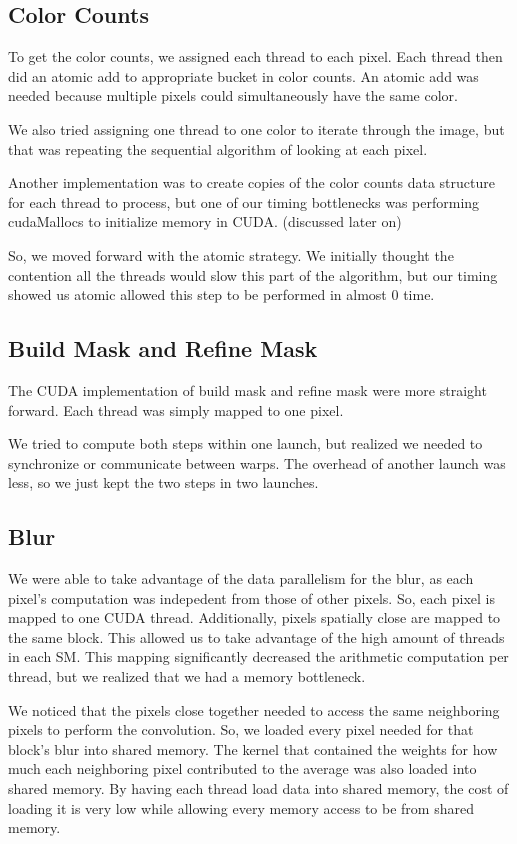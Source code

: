 \documentclass[12pt]{article}
\begin{document}
\subsection{Color Counts}

To get the color counts, we assigned each thread to each pixel. Each thread
then did an atomic add to appropriate bucket in color counts. An atomic add was
needed because multiple pixels could simultaneously have the same color.

We also tried assigning one thread to one color to iterate through the image,
but that was repeating the sequential algorithm of looking at each pixel.

Another implementation was to create copies of the color counts data structure
for each thread to process, but one of our timing bottlenecks was performing
cudaMallocs to initialize memory in CUDA. (discussed later on)

So, we moved forward with the atomic strategy. We initially thought the
contention all the threads would slow this part of the algorithm, but our
timing showed us atomic allowed this step to be performed in almost 0 time.

\subsection{Build Mask and Refine Mask}

The CUDA implementation of build mask and refine mask were more straight
forward. Each thread was simply mapped to one pixel.

We tried to compute both steps within one launch, but realized we needed to
synchronize or communicate between warps. The overhead of another launch was
less, so we just kept the two steps in two launches.

\subsection{Blur}

We were able to take advantage of the data parallelism for the blur, as each
pixel's computation was indepedent from those of other pixels. So, each pixel
is mapped to one CUDA thread. Additionally, pixels spatially close are mapped
to the same block. This allowed us to take advantage of the high amount of
threads in each SM. This mapping significantly decreased the arithmetic
computation per thread, but we realized that we had a memory bottleneck.

We noticed that the pixels close together needed to access the same neighboring
pixels to perform the convolution. So, we loaded every pixel needed for that
block's blur into shared memory. The kernel that contained the weights for how
much each neighboring pixel contributed to the average was also loaded into
shared memory. By having each thread load data into shared memory, the cost of
loading it is very low while allowing every memory access to be from shared
memory.
\end{document}
